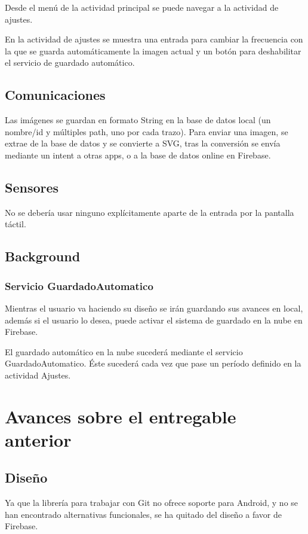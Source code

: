 \documentclass[a4paper,openright,12pt]{article}
\begin{document}
Desde el menú de la actividad principal se puede navegar a la actividad de ajustes.

En la actividad de ajustes se muestra una entrada para cambiar la frecuencia con la que se guarda automáticamente la imagen actual y un botón para deshabilitar el servicio de guardado automático.


\subsection{Comunicaciones}
Las imágenes se guardan en formato String en la base de datos local (un nombre/id y múltiples path, uno por cada trazo).
Para enviar una imagen, se extrae de la base de datos y se convierte a SVG, tras la conversión se envía mediante un intent a otras apps, o a la base de datos online en Firebase.


\subsection{Sensores}
No se debería usar ninguno explícitamente aparte de la entrada por la pantalla táctil.

\subsection{Background}
\subsubsection{Servicio GuardadoAutomatico}
Mientras el usuario va haciendo su diseño se irán guardando sus 
avances en local, además si el usuario lo desea, puede activar el sistema de guardado en la nube en Firebase.

El guardado automático en la nube sucederá mediante el servicio GuardadoAutomatico. Éste sucederá cada vez que pase un período definido en la actividad Ajustes.


\section{Avances sobre el entregable anterior}
\subsection{Diseño}
Ya que la librería para trabajar con Git no ofrece soporte para Android, y no se han encontrado alternativas funcionales, se ha quitado del diseño a favor de Firebase.
\end{document}

